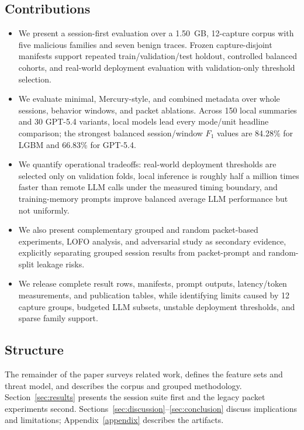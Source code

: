 \documentclass[letterpaper,twocolumn,10pt]{article}
\begin{document}
\subsection{Contributions}
\begin{itemize}
\item We present a session-first evaluation over a 1.50~GB, 12-capture corpus with five malicious families and seven benign traces. Frozen capture-disjoint manifests support repeated train/validation/test holdout, controlled balanced cohorts, and real-world deployment evaluation with validation-only threshold selection.

\item We evaluate minimal, Mercury-style, and combined metadata over whole sessions, behavior windows, and packet ablations. Across 150 local summaries and 30 GPT-5.4 variants, local models lead every mode/unit headline comparison; the strongest balanced session/window $F_1$ values are 84.28\% for LGBM and 66.83\% for GPT-5.4.

\item We quantify operational tradeoffs: real-world deployment thresholds are selected only on validation folds, local inference is roughly half a million times faster than remote LLM calls under the measured timing boundary, and training-memory prompts improve balanced average LLM performance but not uniformly.

\item We also present complementary grouped and random packet-based experiments, LOFO analysis, and adversarial study as secondary evidence, explicitly separating grouped session results from packet-prompt and random-split leakage risks.

\item We release complete result rows, manifests, prompt outputs, latency/token measurements, and publication tables, while identifying limits caused by 12 capture groups, budgeted LLM subsets, unstable deployment thresholds, and sparse family support.
\end{itemize}


\subsection{Structure}
The remainder of the paper surveys related work, defines the feature sets and threat model, and describes the corpus and grouped methodology. Section~\ref{sec:results} presents the session suite first and the legacy packet experiments second. Sections~\ref{sec:discussion}--\ref{sec:conclusion} discuss implications and limitations; Appendix~\ref{appendix} describes the artifacts.
\end{document}
